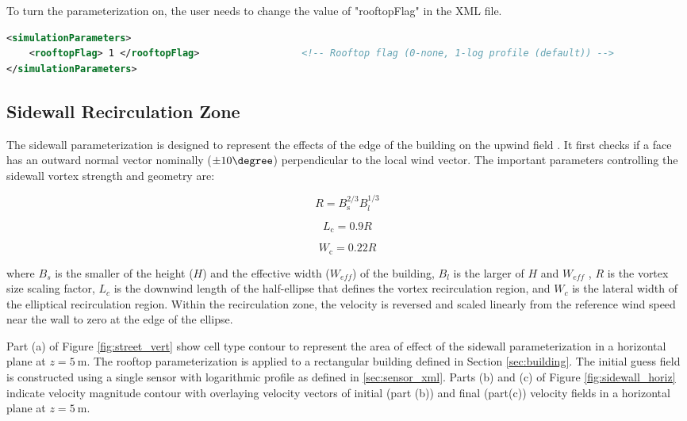 To turn the parameterization on, the user needs to change the value of "rooftopFlag" in the XML file.

\begin{lstlisting}[language=XML]
<simulationParameters>
  	<rooftopFlag> 1 </rooftopFlag> 					<!-- Rooftop flag (0-none, 1-log profile (default)) -->
</simulationParameters>
\end{lstlisting}

\subsection{Sidewall Recirculation Zone}

The sidewall parameterization is designed to represent the effects of the edge of the building on the upwind field \cite{hayati2017comprehensive}. It first checks if a face has an outward normal vector nominally ($\pm 10\degree$)
perpendicular to the local wind vector. The important parameters controlling the sidewall vortex strength and geometry are:

\begin{equation}
R=B_{\mathrm{s}}^{2 / 3} B_{l}^{1 / 3}
\end{equation}

\begin{equation}
L_{\mathrm{c}}=0.9 R
\end{equation}

\begin{equation}
W_{\mathrm{c}}=0.22 R
\end{equation}

where $B_s$ is the smaller of the height ($H$) and the effective width ($W_{eff}$) of the
building, $B_l$ is the larger of $H$ and $W_{eff}$ , $R$ is the vortex size scaling factor, $L_c$ is the downwind length of the half-ellipse that defines the vortex recirculation region, and
$W_c$ is the lateral width of the elliptical recirculation region. Within the recirculation zone, the velocity is reversed and scaled linearly from the reference wind speed near the wall to zero at the edge of the ellipse.

Part (a) of Figure \ref{fig:street_vert} show cell type contour to represent the area of effect of the sidewall parameterization in a horizontal plane at $z=5\ \si{\meter}$. The rooftop parameterization is applied to a rectangular building defined in Section \ref{sec:building}. The initial guess field is constructed using a single sensor with logarithmic profile as defined in \ref{sec:sensor_xml}. Parts (b) and (c) of Figure \ref{fig:sidewall_horiz} indicate velocity magnitude contour with overlaying velocity vectors of initial (part (b)) and final (part(c)) velocity fields in a horizontal plane at $z=5\ \si{\meter}$.

